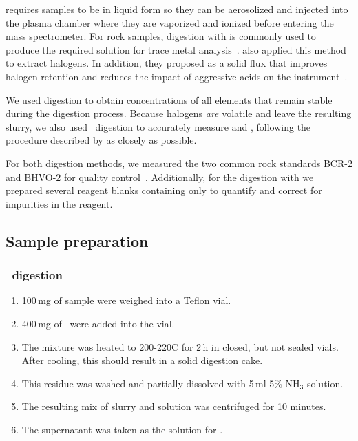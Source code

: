 \ICPMS requires samples to be in liquid form so they can be aerosolized 
and injected into the plasma chamber where they are vaporized and ionized 
before entering the mass spectrometer.
For rock samples, digestion with  is commonly used 
to produce the required solution for trace metal analysis~\parencite{hu-digestion-2014}. 
\textcite{he_rapid_2018} also applied this
method to extract halogens. In addition, they proposed 
as a solid flux that improves halogen retention and reduces the impact of 
aggressive acids on the instrument~\parencite{he_determination_2019}.

We used  digestion to obtain concentrations of all elements
that remain stable during the digestion process. Because halogens \emph{are} volatile and
leave the resulting slurry, 
we also used \ambif\ digestion to accurately measure  and , following the
procedure described by \textcite{he_determination_2019} as closely as possible.

For both digestion methods, we measured the two common 
rock standards BCR-2 and BHVO-2 for quality control~\parencite{bcr2, bhvo2}.
Additionally, for the digestion with \acro{\ambif} we prepared several
reagent blanks containing only \acro{\ambif} to quantify and correct for 
impurities in the reagent.

\subsection{Sample preparation}

\subsubsection{\ambif\ digestion}
\begin{enumerate}
\item 100\,mg of sample were weighed into a Teflon vial.
\item 400\,mg of \ambif\ were added into the vial.
\item The mixture was heated to 200-220\degree C for 2\,h in closed, but not sealed vials.
After cooling, this should result in a solid digestion cake.
\item This residue was washed and partially dissolved with 5\,ml 5\% NH$_3$ solution.
\item The resulting mix of slurry and solution was centrifuged for 10 minutes.
\item The supernatant was taken as the solution for \ICPMS.
\end{enumerate}

